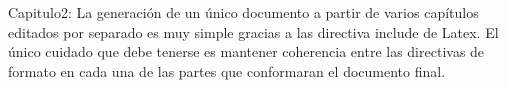 Capitulo2: \newline
La generación de un único documento a partir de varios capítulos editados por separado es muy simple gracias a las directiva include de Latex. El único cuidado que debe tenerse es mantener coherencia entre las directivas de formato en cada una de las partes que conformaran el documento final.
